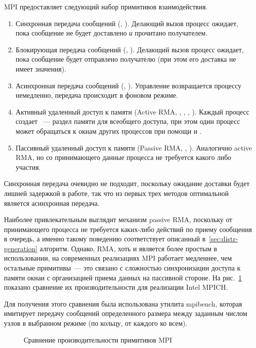 MPI предоставляет следующий набор примитивов взаимодействия.

\begin{enumerate}
\item Синхронная передача сообщений (, ). Делающий вызов процесс
  ожидает, пока сообщение не будет доставлено \emph{и} прочитано получателем.
\item Блокирующая передача сообщений (, ). Делающий вызов процесс
  ожидает, пока сообщение будет отправлено получателю (при этом его доставка не
  имеет значения).
\item Асинхронная передача сообщений (, ). Управление возвращается
  процессу немедленно, передача происходит в фоновом режиме.
\item Активный удаленный доступ к памяти (Active RMA, ,
  , , ). Каждый процесс создает
  ~--- раздел памяти для всеобщего доступа, при этом один процесс может
  обращаться к окнам других процессов при помощи  и .
\item Пассивный удаленный доступ к памяти (Passive RMA, ,
  ). Аналогично active RMA, но со принимающего данные процесса не
  требуется какого либо участия.
\end{enumerate}

Синхронная передача очевидно не подходит, поскольку ожидание доставки будет лишней
задержкой в работе, так что из первых трех методов оптимальной является асинхронная
передача.

Наиболее привлекательным выглядит механизм passive RMA, поскольку от принимающего процесса
не требуется каких-либо действий по приему сообщения в очередь, а именно такому поведению
соответствует описанный в~\ref{sec:distr-generation} алгоритм. Однако, RMA, хоть и
является более простым в использовании, на современных реализациях MPI работает медленнее,
чем остальные примитивы~--- это связано с сложностью синхронизации доступа к памяти окнаи
с организацией приема данных на пассивной стороне. На рис.~\ref{fig:mpi-primitives}
показано сравнение их производительности для реализации Intel MPICH.

Для получения этого сравнения была использована утилита mpibench, которая имитирует
передачу сообщений определенного размера между заданным числом узлов в выбранном режиме
(по кольцу, от каждого ко всем\etc).

\begin{figure}[ht]
  \centering
  \caption{Сравнение производительности примитивов MPI}
  \label{fig:mpi-primitives}
\end{figure}

